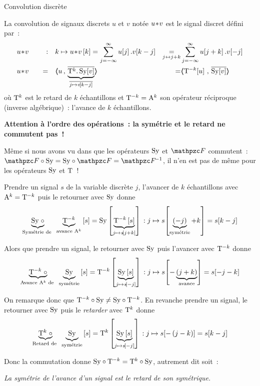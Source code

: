 \begin{definition}{Convolution discrète}
  \label{def:convolution_discrete}
  
  La convolution de signaux discrets $u$ et $v$ notée $u\!\ast\! v$ est le
  signal discret défini par~:
  \begin{align}
    \label{eq:convolution_discrete}
    &u\conv v \quad &:& \quad k \mapsto u\conv v\b{k} =\somme{j=-\infty}{\infty}{u\ded{j}.v\ded{k-j}} &\underset{j\leftrightarrow j+k}{=}&  \somme{j=-\infty}{\infty}{u\ded{j+k}.v\ded{-j}} \nonumber\\
    &u\conv v \quad & = &\quad\scald{u}{\caCest{\conj{\oret^k.\,\Sy\ded{v}}}{\conj{j\mapsto v\ded{k-j}}}} &=& \scald{\oret^{-k}\ded{u}}{\conj{\Sy\ded{v}}} 
  \end{align}
  où $\mathrm{T}^k$ est le retard de $k$ échantillons et
  $\mathrm{T}^{-k}=\mathrm{A}^k$ son opérateur réciproque (inverse
  algébrique)~: l'avance de $k$ échantillons.
\end{definition}

\begin{remarque}
  \textbf{Attention à l'ordre des opérations~: la symétrie et le
    retard ne commutent pas~!}

  Même si nous avons vu dans  que les opérateurs
  $\mathrm{Sy}$ et $\F$ commutent~: $\F\circ\Sy=\Sy\circ\F=\Finv$, il n'en est
  pas de même pour les opérateurs $\mathrm{Sy}$ et $\mathrm{T}$~!

  Prendre un signal $s$ de la variable discrète $j$, l'avancer de $k$
  échantillons avec $\mathrm{A}^k=\mathrm{T}^{-k}$ puis le retourner avec
  $\mathrm{Sy}$ donne
  $$\underbrace{\mathrm{Sy}\;\circ}_{\text{Symétrie de }}\;\underbrace{\mathrm{T}^{-k}}_{\text{avance }\mathrm{A}^k}\left[s\right] = \mathrm{Sy}\left[\underbrace{\mathrm{T}^{-k}\left[s\right]}_{j\mapsto s\!\left[j+k\right]}\right]\,: j\mapsto s\!\left[\underbrace{\left(-j\right)}_{\text{symétrie}}+k\right]=s\!\left[k-j\right]$$

  Alors que prendre un signal, le retourner avec $\mathrm{Sy}$ puis l'avancer
  avec $\mathrm{T}^{-k}$ donne
  $$\underbrace{\mathrm{T}^{-k}\;\circ}_{\text{Avance }\mathrm{A}^k\text{ de }}\;\underbrace{\mathrm{Sy}}_{\text{symétrie}}\left[s\right]= \mathrm{T}^{-k}\left[\underbrace{\mathrm{Sy}\left[s\right]}_{j\mapsto s\!\left[-j\right]}\right]\,: j\mapsto s
  \!\left[-\underbrace{\left(j+k\right)}_{\text{avance}}\right]=s\!\left[-j-k\right]$$

  On remarque donc que $\mathrm{T}^{-k}\circ\mathrm{Sy}\neq\mathrm{Sy}\circ\mathrm{T}^{-k}$. En
  revanche prendre un signal, le retourner avec $\mathrm{Sy}$ puis le
  \emph{retarder} avec $\mathrm{T}^{k}$ donne
  $$\underbrace{\mathrm{T}^{k}\;\circ}_{\text{Retard de }}\;\underbrace{\mathrm{Sy}}_{\text{symétrie}}\left[s\right]= \mathrm{T}^{k}\left[\underbrace{\mathrm{Sy}\left[s\right]}_{j\mapsto s\!\left[-j\right]}\right]\,: j\mapsto s\!\left[-\left(j-k\right)\right]=s\!\left[k-j\right]$$

  Donc la commutation donne $\mathrm{Sy}\circ\mathrm{T}^{-k}=\mathrm{T}^{k}\circ\mathrm{Sy}$,
  autrement dit soit~:

  \emph{ \og{} La symétrie de l'avance d'un signal est le retard de
    son symétrique\fg.}
\end{remarque}

